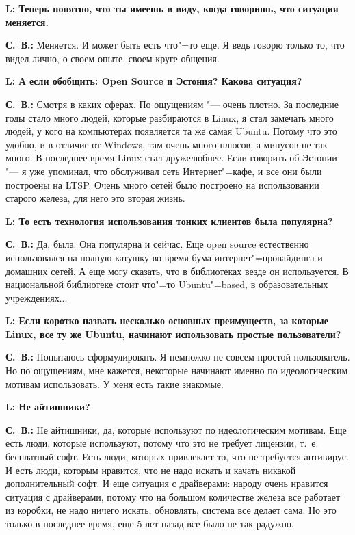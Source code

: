 \documentclass[10pt, a5paper]{article}
\begin{document}
{\noindent \bf L: Теперь понятно, что ты имеешь в виду, когда говоришь, что ситуация меняется.}

{\noindent \bf С.~В.:} Меняется. И может быть есть что"=то еще. Я ведь говорю только то, что видел лично, о своем опыте, своем круге общения.

{\noindent \bf L: А если обобщить: Open Source и Эстония? Какова ситуация?}

{\noindent \bf С.~В.:} Смотря в каких сферах. По ощущениям "--- очень плотно. За последние годы стало много людей, которые разбираются в Linux, я стал замечать много людей, у кого на компьютерах появляется та же самая Ubuntu. Потому что это удобно, и в отличие от Windows, там очень много плюсов, а минусов не так много. В последнее время Linux стал дружелюбнее. Если говорить об Эстонии "--- я уже упоминал, что обслуживал сеть Интернет"=кафе, и все они были построены на LTSP. Очень много сетей было построено на использовании старого железа, для него это вторая жизнь. 

{\noindent \bf L: То есть технология использования тонких клиентов была популярна?}

{\noindent \bf С.~В.:} Да, была. Она популярна и сейчас. Еще open source естественно использовался на полную катушку во время бума интернет"=провайдинга и домашних сетей. А еще могу сказать, что в библиотеках везде он используется. В национальной библиотеке стоит что"=то Ubuntu"=based, в образовательных учреждениях...

{\noindent \bf L: Если коротко назвать несколько основных преимуществ, за которые Linux, все ту же Ubuntu, начинают использовать простые пользователи?}

{\noindent \bf С.~В.:} Попытаюсь сформулировать. Я немножко не совсем простой пользователь. Но по ощущениям, мне кажется, некоторые начинают именно по идеологическим мотивам использовать. У меня есть такие знакомые.

{\noindent \bf L: Не айтишники?}

{\noindent \bf С.~В.:} Не айтишники, да, которые используют по идеологическим мотивам. Еще есть люди, которые используют, потому что это не требует лицензии, т.~е. бесплатный софт. Есть люди, которых привлекает то, что не требуется антивирус. И есть люди, которым нравится, что не надо искать и качать никакой дополнительный софт. И еще ситуация с драйверами: народу очень нравится ситуация с драйверами, потому что на большом количестве железа все работает из коробки, не надо ничего искать, обновлять, система все делает сама. Но это только в последнее время, еще 5 лет назад все было не так радужно.
\end{document}
